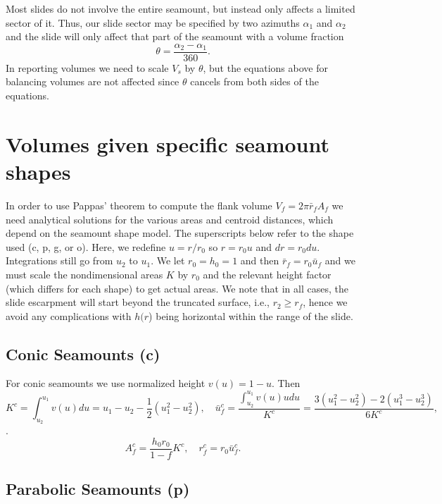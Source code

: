\documentclass[12pt,letterpaper,margin=0.5in]{report}
\begin{document}
Most slides do not involve the entire seamount, but instead only affects a limited sector of it.  Thus, our slide sector may be specified by two
azimuths $\alpha_1$ and $\alpha_2$ and the slide will only affect that part of the seamount with a volume fraction
\begin{equation}
\theta = \frac{\alpha_2 - \alpha_1}{360}.
\end{equation}
In reporting volumes we need to scale $V_s$ by $\theta$, but the equations above for balancing volumes are not affected since $\theta$ cancels from both sides of the equations.

\section{Volumes given specific seamount shapes}

In order to use Pappas' theorem to compute the flank volume $V_f = 2 \pi \bar{r}_f A_f$ we need analytical
solutions for the various areas and centroid distances, which depend on the seamount shape model.  The
superscripts below refer to the shape used (c, p, g, or o). Here,
we redefine $u = r/r_0$ so $r = r_0 u$ and $dr = r_0 du$.  Integrations still go from $u_2$
to $u_1$.  We let $r_0 = h_0 = 1$ and then $\bar{r}_f = r_0 \bar{u}_f$ and we must scale the nondimensional areas $K$
by $r_0$ and the relevant height factor (which differs for each shape) to get actual areas. We note that
in all cases, the slide escarpment will start beyond the truncated surface, i.e., $r_2 \ge r_f$, hence we avoid
any complications with $h(r$) being horizontal within the range of the slide.

\subsection{Conic Seamounts (c)}

For conic seamounts we use normalized height $v(u) = 1 - u$. Then
\begin{equation}
K^c = \int_{u_2}^{u_1} v(u) du = u_1 - u_2 - \frac{1}{2}\left ( u_1^2 - u_2^2 \right ), \quad \bar{u}_f^c = \frac{\int_{u_2}^{u_1} v(u) u du}{K^c} = \frac{3(u_1^2 - u_2^2) - 2 (u_1^3 - u_2^3)}{6K^c},
\end{equation}.
\begin{equation}
A_f^c = \frac{h_0 r_0}{1-f}K^c, \quad r_f^c = r_0\bar{u}_f^c.
\end{equation}

\subsection{Parabolic Seamounts (p)}
\end{document}

